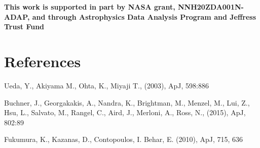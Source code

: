 \documentclass[12pt,linenumbers]{aastex631}
\begin{document}

\newpage
\begin{center}\textbf{This work is supported in part by NASA grant, NNH20ZDA001N-ADAP, and through Astrophysics Data Analysis Program and Jeffress Trust Fund}\end{center}

\section{References}

%
{Ueda, Y., Akiyama M., Ohta, K.,  Miyaji T., (2003), ApJ, 598:886}\par
{Buchner, J., Georgakakis, A., Nandra, K., Brightman, M., Menzel, M., Lui, Z., Hsu, L., Salvato, M., Rangel, C., Aird, J., Merloni, A.,  Ross, N., (2015), ApJ, 802:89}\par
{Fukumura, K., Kazanas, D., Contopoulos, I. Behar, E. (2010), ApJ, 715, 636}\par
%




\end{document}
